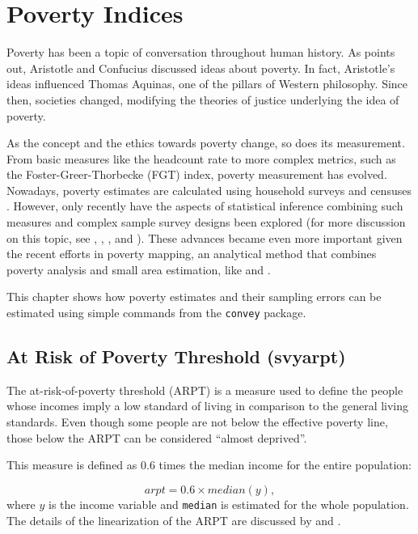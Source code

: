 \documentclass[
]{book}
\begin{document}
\hypertarget{poverty}{%
\chapter{Poverty Indices}\label{poverty}}

Poverty has been a topic of conversation throughout human history. As \textcite{ravallion2016} points out, Aristotle and Confucius discussed ideas about poverty. In fact, Aristotle's ideas influenced Thomas Aquinas, one of the pillars of Western philosophy. Since then, societies changed, modifying the theories of justice underlying the idea of poverty.

As the concept and the ethics towards poverty change, so does its measurement. From basic measures like the headcount rate to more complex metrics, such as the Foster-Greer-Thorbecke (FGT) index, poverty measurement has evolved. Nowadays, poverty estimates are calculated using household surveys and censuses \autocite{deaton1997}. However, only recently have the aspects of statistical inference combining such measures and complex sample survey designs been explored (for more discussion on this topic, see \textcite{deville1999}, \textcite{berger2003}, \textcite{bhat2007}, and \textcite{osier2009}). These advances became even more important given the recent efforts in poverty mapping, an analytical method that combines poverty analysis and small area estimation, like \textcite{elbers2003} and \textcite{bedi2007}.

This chapter shows how poverty estimates and their sampling errors can be estimated using simple commands from the \texttt{convey} package.

\hypertarget{at-risk-of-poverty-threshold-svyarpt}{%
\section{At Risk of Poverty Threshold (svyarpt)}\label{at-risk-of-poverty-threshold-svyarpt}}

The at-risk-of-poverty threshold (ARPT) is a measure used to define the people whose incomes imply a low standard of living in comparison to the general living standards. Even though some people are not below the effective poverty line, those below the ARPT can be considered ``almost deprived''.

This measure is defined as \(0.6\) times the median income for the entire population:

\[
arpt = 0.6 \times median(y),
\]
where \(y\) is the income variable and \texttt{median} is estimated for the whole population. The details of the linearization of the ARPT are discussed by \textcite{deville1999} and \textcite{osier2009}.
\end{document}
